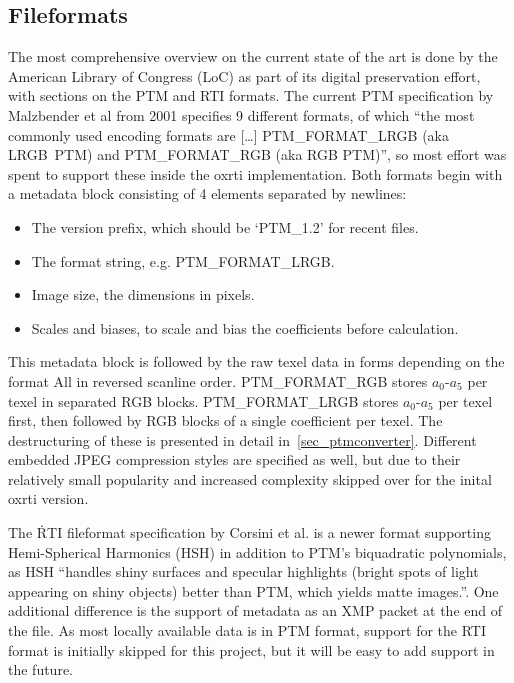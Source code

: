 \subsection{Fileformats}\label{sec_relfile}
The most comprehensive overview on the current state of the art is done by the
American Library of Congress (LoC) as part of its digital preservation effort, with
sections on the PTM\cite{library_of_congress_polynomial_2018} and
RTI\cite{library_of_congress_reflectance_2018} formats. The current PTM
specification by Malzbender et al\cite*{malzbender_polynomial_2001} from 2001 specifies 9
different formats, of which ``the most commonly used encoding formats are
[\ldots] PTM\_FORMAT\_LRGB (aka LRGB\ PTM) and
PTM\_FORMAT\_RGB (aka RGB PTM)''\cite{library_of_congress_polynomial_2018}, so most effort was
spent to support these inside the oxrti implementation. Both formats begin with
a metadata block consisting of 4 elements separated by newlines:
\begin{itemize}
\item The version prefix, which should be `PTM\_1.2' for recent files.
\item The format string, e.g. PTM\_FORMAT\_LRGB.
\item Image size, the dimensions in pixels.
\item Scales and biases, to scale and bias the coefficients before calculation.
\end{itemize}
This metadata block is followed by the raw texel data in forms depending on the
format All in reversed scanline order. PTM\_FORMAT\_RGB stores $a_{0}$-$a_{5}$ per
texel in separated RGB blocks. PTM\_FORMAT\_LRGB stores $a_{0}$-$a_{5}$ per texel
first, then followed by RGB blocks of a single coefficient per texel. The
destructuring of these is presented in detail in~\autoref{sec_ptmconverter}. Different
embedded JPEG compression styles are specified as well, but due to their
relatively small popularity and increased complexity skipped over for the inital
oxrti version.

The \.RTI fileformat specification by Corsini et al.\cite*{corsini_rti_2010} is a
newer format supporting Hemi-Spherical Harmonics (HSH) in addition to PTM's
biquadratic polynomials, as HSH ``handles shiny surfaces and specular
highlights (bright spots of light appearing on shiny objects) better than PTM,
which yields matte images.''\cite*{library_of_congress_reflectance_2018}. One
additional difference is the support of metadata as an XMP packet at the end of
the file. As most locally available data is in PTM format, support for the RTI
format is initially skipped for this project, but it will be easy to add support
in the future.

